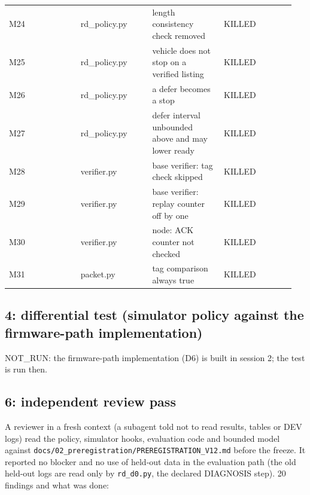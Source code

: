 {\begin{longtable}{p{0.237\linewidth}p{0.237\linewidth}p{0.237\linewidth}p{0.237\linewidth}}
M24 & rd\_policy.py & length consistency check removed & KILLED \\
M25 & rd\_policy.py & vehicle does not stop on a verified listing & KILLED \\
M26 & rd\_policy.py & a defer becomes a stop & KILLED \\
M27 & rd\_policy.py & defer interval unbounded above and may lower ready & KILLED \\
M28 & verifier.py & base verifier: tag check skipped & KILLED \\
M29 & verifier.py & base verifier: replay counter off by one & KILLED \\
M30 & verifier.py & node: ACK counter not checked & KILLED \\
M31 & packet.py & tag comparison always true & KILLED \\
\bottomrule
\end{longtable}}

\subsection*{4: differential test (simulator policy against the firmware-path implementation)}

NOT\_RUN: the firmware-path implementation (D6) is built in session 2; the test is run then.

\subsection*{6: independent review pass}

A reviewer in a fresh context (a subagent told not to read results, tables or DEV logs) read the policy, simulator hooks, evaluation code and bounded model against \texttt{docs/02\_preregistration/PREREGISTRATION\_V12.md} before the freeze. It reported no blocker and no use of held-out data in the evaluation path (the old held-out logs are read only by \texttt{rd\_d0.py}, the declared DIAGNOSIS step). 20 findings and what was done:

